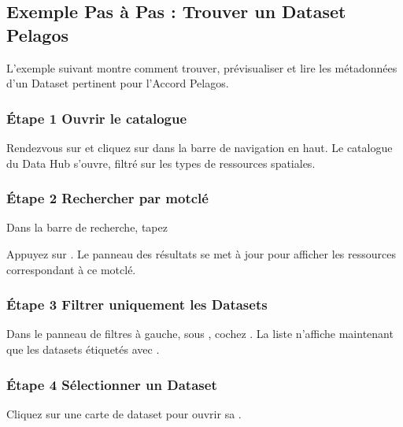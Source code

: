 \documentclass[letterpaper,10pt,english]{sphinxmanual}
\begin{document}
\subsection{Exemple Pas à Pas : Trouver un Dataset Pelagos}
\label{\detokenize{fr/02_trouver_visualiser:exemple-pas-a-pas-trouver-un-dataset-pelagos}}
\sphinxAtStartPar
L’exemple suivant montre comment trouver, prévisualiser et lire les métadonnées d’un
Dataset pertinent pour l’Accord Pelagos.


\subsubsection{Étape 1 \textendash{} Ouvrir le catalogue}
\label{\detokenize{fr/02_trouver_visualiser:etape-1-ouvrir-le-catalogue}}
\sphinxAtStartPar
Rendez\sphinxhyphen{}vous sur  et cliquez sur  dans la barre de
navigation en haut. Le catalogue du Data Hub s’ouvre, filtré sur les types de ressources
spatiales.


\subsubsection{Étape 2 \textendash{} Rechercher par mot\sphinxhyphen{}clé}
\label{\detokenize{fr/02_trouver_visualiser:etape-2-rechercher-par-mot-cle}}
\sphinxAtStartPar
Dans la barre de recherche, tapez

\begin{sphinxVerbatim}[commandchars=\\\{\}]
 
\end{sphinxVerbatim}

\sphinxAtStartPar
Appuyez sur . Le panneau des résultats se met à jour pour afficher les
ressources correspondant à ce mot\sphinxhyphen{}clé.


\subsubsection{Étape 3 \textendash{} Filtrer uniquement les Datasets}
\label{\detokenize{fr/02_trouver_visualiser:etape-3-filtrer-uniquement-les-datasets}}
\sphinxAtStartPar
Dans le panneau de filtres à gauche, sous , cochez .
La liste n’affiche maintenant que les datasets étiquetés avec .


\subsubsection{Étape 4 \textendash{} Sélectionner un Dataset}
\label{\detokenize{fr/02_trouver_visualiser:etape-4-selectionner-un-dataset}}
\sphinxAtStartPar
Cliquez sur une carte de dataset pour ouvrir sa .
\end{document}
